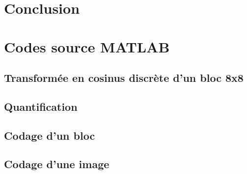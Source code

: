 \documentclass[a4paper, 12pt]{article}
\newcommand{\FSource}[1]{%

}
\begin{document}
\newpage

\section{Conclusion}



\clearpage

%
%
\appendix

\section{Codes source MATLAB}
\subsection{Transformée en cosinus discrète d'un bloc 8x8}\label{dct_code}

\FSource{../MyDCT.m}

\newpage

\subsection{Quantification}\label{quant_code}

\FSource{../QuantM.m}

\newpage

\subsection{Codage d'un bloc}\label{codage_code}

\FSource{../code.m}

\newpage

\subsection{Codage d'une image}\label{codage_image_code}

\FSource{../codJPG.m}

\newpage
\end{document}

